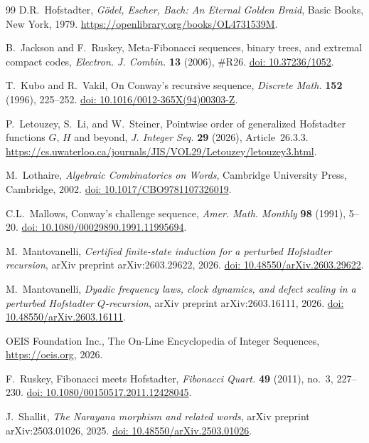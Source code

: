 \documentclass[11pt]{article}
\theoremstyle{definition}
\theoremstyle{remark}
\begin{document}
\begin{thebibliography}{99}
D.R.~Hofstadter,
\textit{G\"odel, Escher, Bach: An Eternal Golden Braid},
Basic Books, New York, 1979.
\url{https://openlibrary.org/books/OL4731539M}.

B.~Jackson and F.~Ruskey,
Meta-Fibonacci sequences, binary trees, and extremal compact codes,
\textit{Electron. J. Combin.} \textbf{13} (2006), \#R26.
\href{https://doi.org/10.37236/1052}{doi: 10.37236/1052}.

T.~Kubo and R.~Vakil,
On Conway's recursive sequence,
\textit{Discrete Math.} \textbf{152} (1996), 225--252.
\href{https://doi.org/10.1016/0012-365X(94)00303-Z}{doi: 10.1016/0012-365X(94)00303-Z}.

P.~Letouzey, S.~Li, and W.~Steiner,
Pointwise order of generalized Hofstadter functions $G$, $H$ and beyond,
\textit{J. Integer Seq.} \textbf{29} (2026), Article~26.3.3.
\url{https://cs.uwaterloo.ca/journals/JIS/VOL29/Letouzey/letouzey3.html}.

M.~Lothaire,
\textit{Algebraic Combinatorics on Words},
Cambridge University Press, Cambridge, 2002.
\href{https://doi.org/10.1017/CBO9781107326019}{doi: 10.1017/CBO9781107326019}.

C.L.~Mallows,
Conway's challenge sequence,
\textit{Amer. Math. Monthly} \textbf{98} (1991), 5--20.
\href{https://doi.org/10.1080/00029890.1991.11995694}{doi: 10.1080/00029890.1991.11995694}.

M.~Mantovanelli,
\textit{Certified finite-state induction for a perturbed Hofstadter
recursion},
arXiv preprint arXiv:2603.29622, 2026.
\href{https://doi.org/10.48550/arXiv.2603.29622}{doi: 10.48550/arXiv.2603.29622}.

M.~Mantovanelli,
\textit{Dyadic frequency laws, clock dynamics, and defect scaling in a
perturbed Hofstadter $Q$-recursion},
arXiv preprint arXiv:2603.16111, 2026.
\href{https://doi.org/10.48550/arXiv.2603.16111}{doi: 10.48550/arXiv.2603.16111}.

OEIS Foundation Inc.,
The On-Line Encyclopedia of Integer Sequences,
\url{https://oeis.org}, 2026.

F.~Ruskey,
Fibonacci meets Hofstadter,
\textit{Fibonacci Quart.} \textbf{49} (2011), no.~3, 227--230.
\href{https://doi.org/10.1080/00150517.2011.12428045}{doi: 10.1080/00150517.2011.12428045}.

J.~Shallit,
\textit{The Narayana morphism and related words},
arXiv preprint arXiv:2503.01026, 2025.
\href{https://doi.org/10.48550/arXiv.2503.01026}{doi: 10.48550/arXiv.2503.01026}.


\end{thebibliography}
\end{document}
